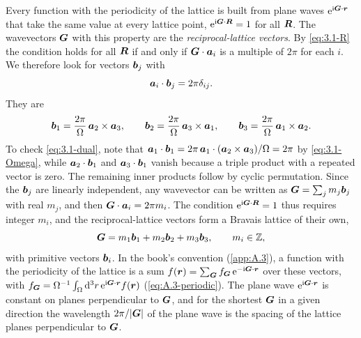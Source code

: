 Every function with the periodicity of the lattice is built from plane waves $\mathrm{e}^{\mathrm{i}\bm{G}\cdot\bm{r}}$ that take the same value at every lattice point, $\mathrm{e}^{\mathrm{i}\bm{G}\cdot\bm{R}} = 1$ for all $\bm{R}$. The wavevectors $\bm{G}$ with this property are the \emph{reciprocal-lattice vectors}. By \cref{eq:3.1-R} the condition holds for all $\bm{R}$ if and only if $\bm{G}\cdot\bm{a}_i$ is a multiple of $2\pi$ for each $i$. We therefore look for vectors $\bm{b}_j$ with
\begin{equation}
  \bm{a}_i\cdot\bm{b}_j = 2\pi\delta_{ij} .
  \label{eq:3.1-dual}
\end{equation}
They are
\begin{equation}
  \bm{b}_1 = \frac{2\pi}{\Omega}\,\bm{a}_2\times\bm{a}_3, \qquad
  \bm{b}_2 = \frac{2\pi}{\Omega}\,\bm{a}_3\times\bm{a}_1, \qquad
  \bm{b}_3 = \frac{2\pi}{\Omega}\,\bm{a}_1\times\bm{a}_2 .
  \label{eq:3.1-b}
\end{equation}
To check \cref{eq:3.1-dual}, note that $\bm{a}_1\cdot\bm{b}_1 = 2\pi\,\bm{a}_1\cdot(\bm{a}_2\times\bm{a}_3)/\Omega = 2\pi$ by \cref{eq:3.1-Omega}, while $\bm{a}_2\cdot\bm{b}_1$ and $\bm{a}_3\cdot\bm{b}_1$ vanish because a triple product with a repeated vector is zero. The remaining inner products follow by cyclic permutation. Since the $\bm{b}_j$ are linearly independent, any wavevector can be written as $\bm{G} = \sum_jm_j\bm{b}_j$ with real $m_j$, and then $\bm{G}\cdot\bm{a}_i = 2\pi m_i$. The condition $\mathrm{e}^{\mathrm{i}\bm{G}\cdot\bm{R}} = 1$ thus requires integer $m_i$, and the reciprocal-lattice vectors form a Bravais lattice of their own,
\begin{equation}
  \bm{G} = m_1\bm{b}_1 + m_2\bm{b}_2 + m_3\bm{b}_3, \qquad m_i \in \mathbb{Z},
  \label{eq:3.1-G}
\end{equation}
with primitive vectors $\bm{b}_i$. In the book's convention (\cref{app:A.3}), a function with the periodicity of the lattice is a sum $f(\bm{r}) = \sum_{\bm{G}}f_{\bm{G}}\,\mathrm{e}^{-\mathrm{i}\bm{G}\cdot\bm{r}}$ over these vectors, with $f_{\bm{G}} = \Omega^{-1}\int_\Omega\mathrm{d}^3r\,\mathrm{e}^{\mathrm{i}\bm{G}\cdot\bm{r}}f(\bm{r})$ (\cref{eq:A.3-periodic}). The plane wave $\mathrm{e}^{\mathrm{i}\bm{G}\cdot\bm{r}}$ is constant on planes perpendicular to $\bm{G}$, and for the shortest $\bm{G}$ in a given direction the wavelength $2\pi/|\bm{G}|$ of the plane wave is the spacing of the lattice planes perpendicular to $\bm{G}$.

